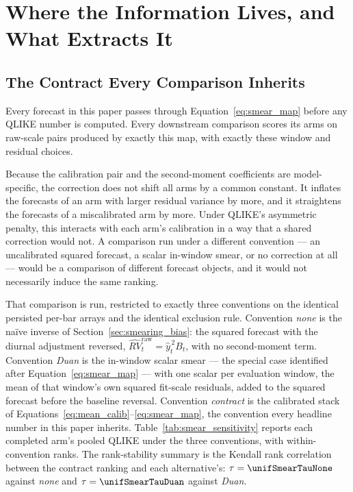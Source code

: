 \section{Where the Information Lives, and What Extracts It}
\label{sec:buckets}


\subsection{The Contract Every Comparison Inherits}
\label{sec:smearing_contract}

Every forecast in this paper passes through Equation~\eqref{eq:smear_map}
before any QLIKE number is computed. Every downstream comparison
 scores its arms on raw-scale pairs produced by exactly this map,
with exactly these window and residual choices.

Because the calibration pair and the second-moment coefficients are
model-specific, the correction does not shift all arms by a common
constant. It inflates the forecasts of an arm with larger residual
variance by more, and it straightens the forecasts of a miscalibrated arm
by more. Under QLIKE's asymmetric penalty, this interacts with each arm's
calibration in a way that a shared correction would not. A comparison run
under a different convention --- an uncalibrated squared forecast, a
scalar in-window smear, or no correction at all --- would be a comparison
of different forecast objects, and it would not necessarily induce the
same ranking.

That comparison is run, restricted to exactly three conventions on the
identical persisted per-bar arrays and the identical exclusion rule.
Convention \emph{none} is the na\"ive inverse of
Section~\ref{sec:smearing_bias}: the squared forecast with the diurnal
adjustment reversed, $\widehat{RV}_t^{\mathrm{raw}} = \hat{y}_t^{\,2} B_t$,
with no second-moment term. Convention \emph{Duan} is the in-window scalar
smear --- the \citet{Duan1983} special case identified after
Equation~\eqref{eq:smear_map} --- with one scalar per evaluation window,
the mean of that window's own squared fit-scale residuals, added to the
squared forecast before the baseline reversal. Convention \emph{contract}
is the calibrated stack of
Equations~\eqref{eq:mean_calib}--\eqref{eq:smear_map}, the convention
every headline number in this paper inherits.
Table~\ref{tab:smear_sensitivity} reports each completed arm's pooled
QLIKE under the three conventions, with within-convention ranks. The
rank-stability summary is the Kendall rank correlation between the
contract ranking and each alternative's:
$\tau = \unifSmearTauNone$ against \emph{none} and
$\tau = \unifSmearTauDuan$ against \emph{Duan}.

